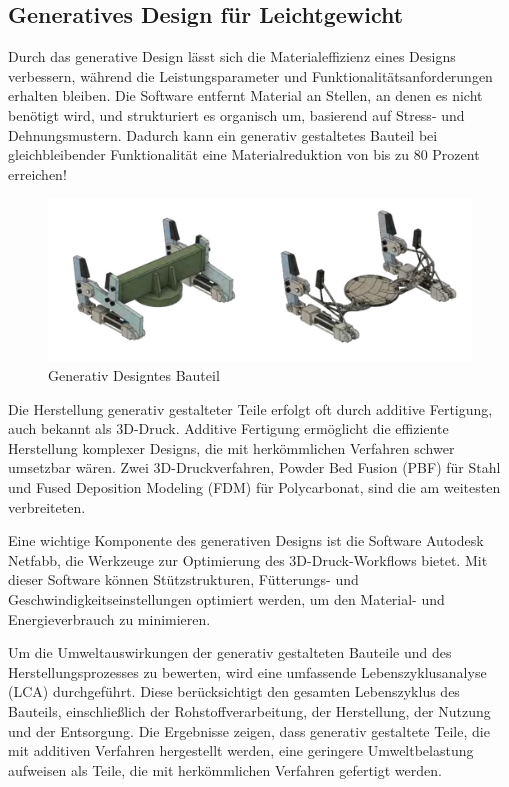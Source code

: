 \subsection*{Generatives Design für Leichtgewicht}

Durch das generative Design lässt sich die Materialeffizienz eines Designs verbessern, während die Leistungsparameter und Funktionalitätsanforderungen erhalten bleiben. Die Software entfernt Material an Stellen, an denen es nicht benötigt wird, und strukturiert es organisch um, basierend auf Stress- und Dehnungsmustern. Dadurch kann ein generativ gestaltetes Bauteil bei gleichbleibender Funktionalität eine Materialreduktion von bis zu 80 Prozent erreichen!

\begin{figure}[h]
  \begin{minipage}{0.5\textwidth}
    \centering
    \includegraphics[width=\textwidth]{./images/WhatsApp Image 2023-06-11 at 23.48.25.jpeg}
  \end{minipage}
  \caption{Generativ Designtes Bauteil}
  \label{fig:meinbild}
\end{figure}

Die Herstellung generativ gestalteter Teile erfolgt oft durch additive Fertigung, auch bekannt als 3D-Druck. Additive Fertigung ermöglicht die effiziente Herstellung komplexer Designs, die mit herkömmlichen Verfahren schwer umsetzbar wären. Zwei 3D-Druckverfahren, Powder Bed Fusion (PBF) für Stahl und Fused Deposition Modeling (FDM) für Polycarbonat, sind die am weitesten verbreiteten.

Eine wichtige Komponente des generativen Designs ist die Software Autodesk Netfabb, die Werkzeuge zur Optimierung des 3D-Druck-Workflows bietet. Mit dieser Software können Stützstrukturen, Fütterungs- und Geschwindigkeitseinstellungen optimiert werden, um den Material- und Energieverbrauch zu minimieren.

Um die Umweltauswirkungen der generativ gestalteten Bauteile und des Herstellungsprozesses zu bewerten, wird eine umfassende Lebenszyklusanalyse (LCA) durchgeführt. Diese berücksichtigt den gesamten Lebenszyklus des Bauteils, einschließlich der Rohstoffverarbeitung, der Herstellung, der Nutzung und der Entsorgung. Die Ergebnisse zeigen, dass generativ gestaltete Teile, die mit additiven Verfahren hergestellt werden, eine geringere Umweltbelastung aufweisen als Teile, die mit herkömmlichen Verfahren gefertigt werden.



